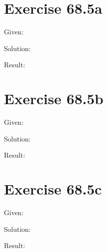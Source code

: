 \documentclass[a4paper, 10pt]{scrartcl}
\begin{document}
\section{Exercise 68.5a}

Given:

Solution:

Result:

\section{Exercise 68.5b}

Given:

Solution:

Result:

\section{Exercise 68.5c}

Given:

Solution:

Result:
\end{document}

